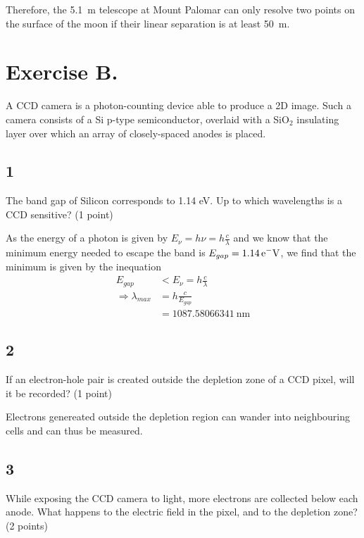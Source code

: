 \documentclass[11pt,a4paper,twoside]{article}
\newcommand{\electron}{\ce{e^-}}
\begin{document}
Therefore, the \SI{5.1}{\meter} telescope at Mount Palomar can only resolve two points on the surface of the moon if their linear separation is at least \SI{50}{\meter}.

\section*{Exercise B.} 

A CCD camera is a photon-counting device able to produce a 2D image.
Such a camera consists of a Si p-type semiconductor, overlaid with a SiO$_2$ 
insulating layer over which an array of closely-spaced anodes is placed.

\subsection*{1}
The band gap of Silicon corresponds to 1.14 eV. Up to which wavelengths is a 
CCD sensitive? (1 point)

As the energy of a photon is given by $E_{\nu} = h \nu = h \frac{c}{\lambda}$ 
and we know that the minimum energy needed to escape the band is 
$E_{gap} = \SI{1.14}{\electron\volt}$, we find that the minimum is given by 
the inequation
\begin{align}
    E_{gap} &< E_\nu = h \frac{c}{\lambda} \\
    \Rightarrow \lambda_{max} &= h \frac{c}{E_{gap}} \\
    &= \SI[round-mode=places, round-precision=1]{1087.58066341}{\nano\meter}
\end{align}

\subsection*{2}
If an electron-hole pair is created outside the depletion zone of a CCD pixel, 
will it be recorded? (1 point)


Electrons genereated outside the depletion region can wander into neighbouring 
cells and can thus be measured.

\subsection*{3}
While exposing the CCD camera to light, more electrons are collected below each
anode. What happens to the electric field in the pixel, and to the depletion 
zone? (2 points)
\end{document}
